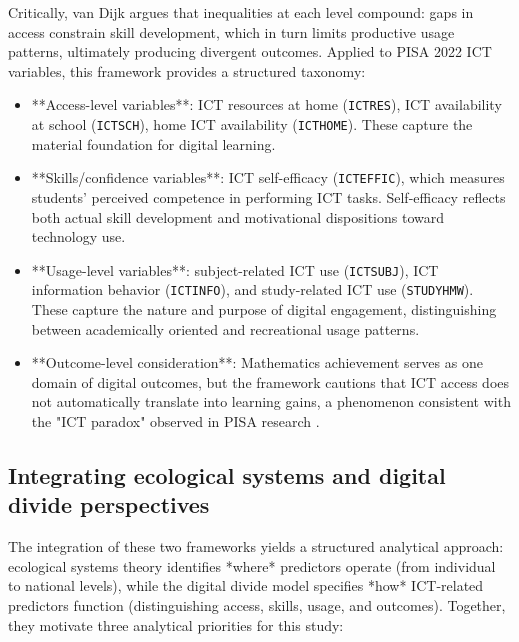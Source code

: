\documentclass[pdflatex,sn-mathphys-ay]{sn-jnl}
\begin{document}
Critically, van Dijk argues that inequalities at each level compound: gaps in access constrain skill development, which in turn limits productive usage patterns, ultimately producing divergent outcomes. Applied to PISA 2022 ICT variables, this framework provides a structured taxonomy:

\begin{itemize}
\item **Access-level variables**: ICT resources at home (\texttt{ICTRES}), ICT availability at school (\texttt{ICTSCH}), home ICT availability (\texttt{ICTHOME}). These capture the material foundation for digital learning.
\item **Skills/confidence variables**: ICT self-efficacy (\texttt{ICTEFFIC}), which measures students' perceived competence in performing ICT tasks. Self-efficacy reflects both actual skill development and motivational dispositions toward technology use.
\item **Usage-level variables**: subject-related ICT use (\texttt{ICTSUBJ}), ICT information behavior (\texttt{ICTINFO}), and study-related ICT use (\texttt{STUDYHMW}). These capture the nature and purpose of digital engagement, distinguishing between academically oriented and recreational usage patterns.
\item **Outcome-level consideration**: Mathematics achievement serves as one domain of digital outcomes, but the framework cautions that ICT access does not automatically translate into learning gains, a phenomenon consistent with the "ICT paradox" observed in PISA research \citep{Joshi_2025_digital_literacy}.
\end{itemize}

\subsection{Integrating ecological systems and digital divide perspectives}

The integration of these two frameworks yields a structured analytical approach: ecological systems theory identifies *where* predictors operate (from individual to national levels), while the digital divide model specifies *how* ICT-related predictors function (distinguishing access, skills, usage, and outcomes). Together, they motivate three analytical priorities for this study:
\end{document}
